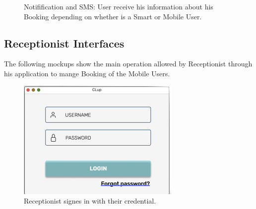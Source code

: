 \begin{figure}[H]
  \caption{Notifification and SMS: User receive his information about his Booking depending on whether is a Smart or Mobile User.}
\end{figure}



\subsection{Receptionist Interfaces}
The following mockups show the main operation allowed by Receptionist through his application to mange Booking of the Mobile Users.



\begin{figure}[H]
  \caption{Receptionist signes in with their credential.}
  \label{fig:Login}
  \centering
  \includegraphics[scale=0.55]{images/mockup/LOGIN_REC.png}

\end{figure}

